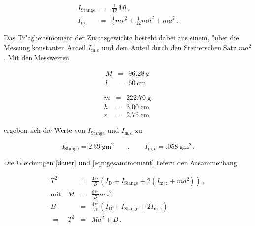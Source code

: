 		\begin{eqnarray*}
			I_\mathrm{Stange} & = & \frac{1}{12} M l \,, \\
			I_\mathrm{m} & = & \frac{1}{4}mr^2 + \frac{1}{12}mh^2 + ma^2 \,.
		\end{eqnarray*}

		Das Tr"agheitsmoment der Zusatzgewichte besteht dabei aus einem, "uber die Messung konstanten Anteil $I_\mathrm{m,c}$ und dem Anteil durch den Steinerschen Satz $ma^2$.
		Mit den Messwerten
		
		\begin{figure}[h!]
			\begin{minipage}[t]{7cm}
				\begin{eqnarray*}
					M & = & \SI{96.28}{\gram} \, \\
					l & = & \SI{60}{\centi \meter} \,
				\end{eqnarray*}
			\end{minipage}
			\hfill
			\begin{minipage}[t]{7cm}
				\begin{eqnarray*}
					m & = & \SI{222.70}{\gram} \, \\
					h & = & \SI{3.00}{\centi \meter} \, \\
					r & = & \SI{2.75}{\centi \meter} \,
				\end{eqnarray*}
			\end{minipage}
		\end{figure}

		ergeben sich die Werte von $I_\mathrm{Stange}$ und $I_\mathrm{m,c}$ zu

		\begin{equation*}
			I_\mathrm{Stange} = \SI{2.89}{\gram \meter \squared} \qquad , \qquad I_\mathrm{m,c} = \SI{.058}{\gram \meter \squared} \,.
		\end{equation*}

		Die Gleichungen \eqref{dauer} und \eqref{eqn:gesamtmoment} liefern den Zusammenhang

		\begin{eqnarray*}
			T^2 & = & \frac{4 \pi^2}{D} \left(I_\mathrm{D} + I_\mathrm{Stange} + 2\left(I_\mathrm{m,c} + ma^2 \right)\right) \,, \\
			\mathrm{mit} \quad M & = & \frac{8 \pi^2}{D} m a^2 \\
			B & = & \frac{4 \pi^2}{D}(I_\mathrm{D} + I_\mathrm{Stange} + 2I_\mathrm{m,c}) \\
			\Rightarrow \quad T^2 & = & M a^2 + B \,.
		\end{eqnarray*}

